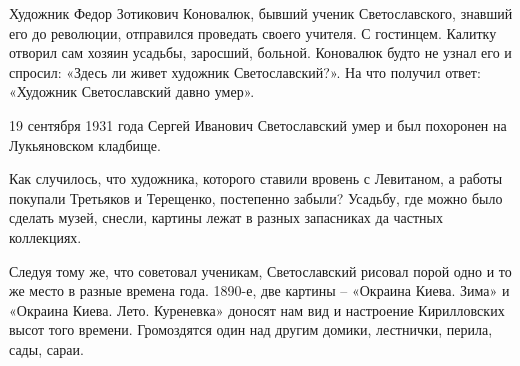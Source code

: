 Художник Федор Зотикович Коновалюк, бывший ученик Светославского, знавший его до революции, отправился проведать своего учителя. С гостинцем. Калитку отворил сам хозяин усадьбы, заросший, больной. Коновалюк будто не узнал его и спросил: «Здесь ли живет художник Светославский?». На что получил ответ: «Художник Светославский давно умер». 

19 сентября 1931 года Сергей Иванович Светославский умер и был похоронен на Лукьяновском кладбище.

Как случилось, что художника, которого ставили вровень с Левитаном, а работы покупали Третьяков и Терещенко, постепенно забыли? Усадьбу, где можно было сделать музей, снесли, картины лежат в разных запасниках да частных коллекциях.


Следуя тому же, что советовал ученикам, Светославский рисовал порой одно и то же место в разные времена года. 1890-е, две картины – «Окраина Киева. Зима» и «Окраина Киева. Лето. Куреневка» доносят нам вид и настроение Кирилловских высот того времени. Громоздятся один над другим домики, лестнички, перила, сады, сараи.

